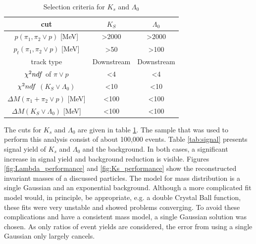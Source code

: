  
\begin{table}[h]
\caption{Selection criteria for $K_s$ and $\Lambda_0$ }
\begin{tabular}{|c|c|c|}
\hline
cut                                      & $K_S$              & $\Lambda_0$        \\ \hline
$p(\pi_1, \pi_2 \lor p)$ {[}MeV{]}              & \textgreater{}2000 & \textgreater{}2000 \\ \hline
$p_t(\pi_1, \pi_2 \lor p)$ {[}MeV{]}            & \textgreater{}50   & \textgreater{}100  \\ \hline
track type                               & Downstream         & Downstream         \\ \hline
$\chi^2\/ndf$ of $\pi \lor p$              & \textless{}4       & \textless{}4       \\ \hline
$\chi^2\/ndf$ $(K_S \lor \Lambda_0)$       & \textless{}10      & \textless{}10      \\ \hline
$\Delta M(\pi_1 + \pi_2 \lor p)$ {[}MeV{]} & \textless{}100     & \textless{}100     \\ \hline
$\Delta M(K_S \lor \Lambda_0)$ {[}MeV{]}   & \textless{}100     & \textless{}100     \\ \hline
\end{tabular}
\label{tab:cuts}
\end{table}
 
 
 The cuts for $K_s$ and $\Lambda_0$ are given in table \ref{tab:cuts}. The sample that was used to perform this analysis consist of about 100,000 events. Table \ref{tab:signal} presents signal yield of $K_s$ and $\Lambda_0$ and the background. In both cases, a significant increase in signal yield and background reduction is visible. Figures \ref{fig:Lambda_performance} and \ref{fig:Ks_performance} show the reconstructed invariant masses of a discussed particles. The model for mass distribution is a single Gaussian and an exponential background. Although a more complicated fit model would, in principle, be appropriate, e.g. a double Crystal Ball function, these fits were very unstable and showed problems converging. To avoid these complications and have a consistent mass model, a single Gaussian solution was chosen. As only ratios of event yields are considered, the error from using a single Gaussian only largely cancels. 
 

